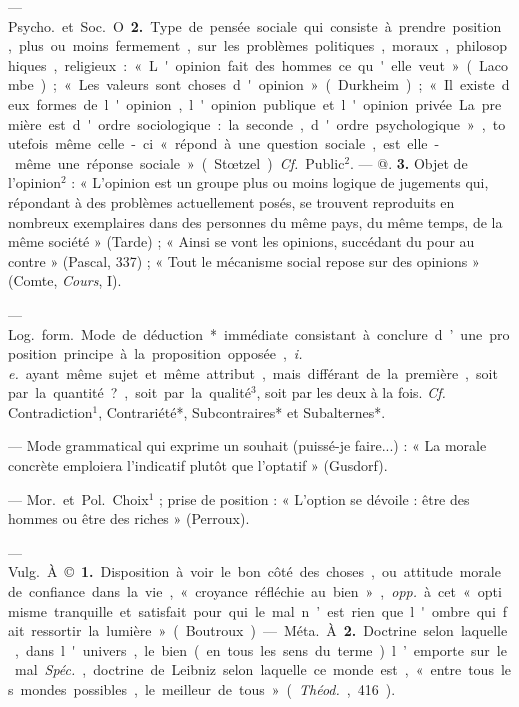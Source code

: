 \begin{itemize}[leftmargin=1cm, label=, itemsep=1pt]
— \si{Psycho.} et \si{Soc.} O. {\bf 2.} Type de
pensée sociale qui consiste à prendre
position, plus ou moins fermement,
sur les problèmes politiques, moraux,
philosophiques, religieux : « L'opinion fait des hommes ce qu'elle
veut » (Lacombe) ; « Les valeurs
sont choses d'opinion » (Durkheim) ;
« Il existe deux formes de l'opinion,
l'opinion publique et l'opinion privée.
La première est d'ordre sociologique: ... la seconde, d'ordre psychologique », toutefois même celle-ci
« répond à une question sociale, est
elle-même une réponse sociale »
(Stœtzel). {\it Cf.} Public$^2$. — @. {\bf 3.} Objet
de l'opinion$^2$ : « L'opinion est un
groupe plus ou moins logique de
jugements qui, répondant à des
problèmes actuellement posés, se
trouvent reproduits en nombreux
exemplaires dans des personnes du
même pays, du même temps, de la
même société » (Tarde) ; « Ainsi se
vont les opinions, succédant du pour
au contre » (Pascal, 337) ; « Tout le
mécanisme social repose sur des
opinions » (Comte, {\it Cours}, I).

 — \si{Log.} \si{form.} Mode de
déduction* immédiate consistant à
conclure d’une proposition principe
à la proposition opposée, {\it i. e.} ayant
même sujet et même attribut, mais
différant de la première, soit par la
quantité?, soit par la qualité$^3$, soit
par les deux à la fois. {\it Cf.} Contradiction$^1$, Contrariété*, Subcontraires*
et Subalternes*.

 — Mode grammatical qui
exprime un souhait (puissé-je
faire...) : « La morale concrète emploiera l'indicatif plutôt que l’optatif » (Gusdorf).

 — \si{Mor.} et \si{Pol.} Choix$^1$ ; prise
de position : « L'option se dévoile :
être des hommes ou être des riches »
(Perroux).

 — \si{Vulg.} À. © {\bf 1.} Disposition
à voir le bon côté des choses, ou
attitude morale de confiance dans
la vie, « croyance réfléchie au bien »,
{\it opp.} à cet « optimisme tranquille et
satisfait pour qui le mal n’est rien
que l'ombre qui fait ressortir la
lumière » (Boutroux).

— \si{Méta.} À. {\bf 2.} Doctrine selon
laquelle, dans l'univers, le bien (en
tous les sens du terme) l’emporte
sur le mal. {\it Spéc.}, doctrine de Leibniz
selon laquelle ce monde est, « entre
tous les mondes possibles, le meilleur de tous » ({\it Théod.}, 416).


\end{itemize}
